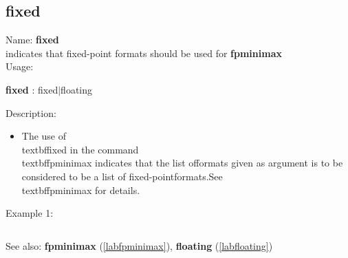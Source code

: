 \subsection{fixed}
\label{labfixed}
\noindent Name: \textbf{fixed}\\
indicates that fixed-point formats should be used for \textbf{fpminimax}\\
\noindent Usage: 
\begin{center}
\textbf{fixed} : \textsf{fixed$|$floating}\\
\end{center}
\noindent Description: \begin{itemize}

\item The use of \\textbf{fixed} in the command \\textbf{fpminimax} indicates that the list of\n   formats given as argument is to be considered to be a list of fixed-point\n   formats.\n   See \\textbf{fpminimax} for details.\n\end{itemize}
\noindent Example 1: 
\begin{center}\begin{minipage}{15cm}\begin{Verbatim}[frame=single]
\end{Verbatim}
\end{minipage}\end{center}
See also: \textbf{fpminimax} (\ref{labfpminimax}), \textbf{floating} (\ref{labfloating})
